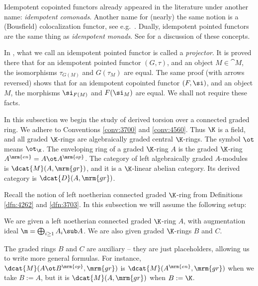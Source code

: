 \begin{rem} \label{rem:3896}
Idempotent copointed functors already appeared in the literature under another 
name: {\em idempotent comonads}. Another name for (nearly) the same notion is 
a (Bousfield) colocalization functor, see  e.g.\ \cite{Kr2}. 
Dually, idempotent pointed functors are the same 
thing as {\em idempotent monads}. See \cite{nLab} for a discussion of these 
concepts. 

In \cite[Section 4.1]{KaSc2}, what we call an idempotent pointed functor is 
called a {\em projector}. It is proved there that for an idempotent 
pointed functor $(G, \tau)$, and an object $M \in \cat{M}$,  
the isomorphisms $\tau_{G(M)}$ and $G(\tau_M)$ are equal. 
The same proof (with arrows reversed) shows that for an idempotent 
copointed functor $(F, \si)$, and an object $M$,  
the morphisms $\si_{F(M)}$ and $F(\si_M)$ are equal. We shall not require these 
facts. 
\end{rem}




\label{subsec:der-tors-graded}

In this subsection we begin the study of derived torsion over a connected 
graded ring. We adhere to Conventions \ref{conv:3700} and \ref{conv:4560}.
Thus $\K$ is a field, and all graded $\K$-rings are 
algebraically graded central $\K$-rings. The symbol $\ot$ means $\ot_{\K}$. 
The enveloping ring of a graded $\K$-ring $A$ is 
the graded $\K$-ring 
$A^{\mrm{en}} = A \ot A^{\mrm{op}}$. 
The category of left algebraically graded $A$-modules is 
$\dcat{M}(A, \mrm{gr})$, and it is a $\K$-linear abelian category.
Its derived category is $\dcat{D}(A, \mrm{gr})$.

Recall the notion of left noetherian connected graded $\K$-ring from 
Definitions \ref{dfn:4262} and \ref{dfn:3703}. In this subsection we will 
assume the following setup:

\begin{setup} \label{setup:3755}
We are given a left noetherian connected graded $\K$-ring $A$, with 
augmentation ideal 
$\m = \bigoplus_{i \geq 1} A_i \sub A$.
We are also given graded $\K$-rings $B$ and $C$.
\end{setup}

The graded rings $B$ and $C$ are auxiliary -- they are just placeholders, 
allowing us to write more general formulas. For instance, 
$\dcat{M}(A \ot B^{\mrm{op}}, \mrm{gr})$
is $\dcat{M}(A^{\mrm{en}}, \mrm{gr})$ when we take $B := A$, but it is 
$\dcat{M}(A, \mrm{gr})$ when $B := \K$. 

